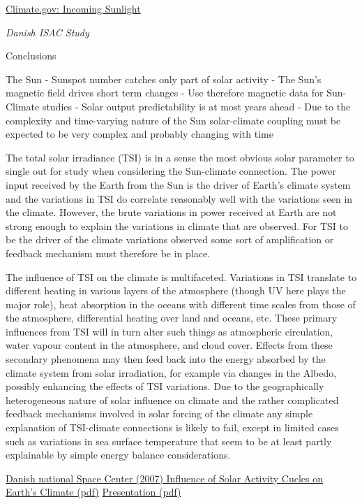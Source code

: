 \documentclass[
]{book}
\begin{document}
\href{https://www.climate.gov/news-features/understanding-climate/climate-change-incoming-sunlight}{Climate.gov: Incoming Sunlight}

\emph{Danish ISAC Study}

Conclusions

The Sun
- Sunspot number catches only part of solar activity
- The Sun's magnetic field drives short term changes
- Use therefore magnetic data for Sun-Climate studies
- Solar output predictability is at most years ahead
- Due to the complexity and time-varying nature of the Sun solar-climate coupling must be expected to be very complex and probably changing with time

The total solar irradiance (TSI) is in a sense the most obvious solar parameter to single
out for study when considering the Sun-climate connection. The power input received by
the Earth from the Sun is the driver of Earth's climate system and the variations in TSI do
correlate reasonably well with the variations seen in the climate. However, the brute
variations in power received at Earth are not strong enough to explain the variations in
climate that are observed.
For TSI to be the driver of the climate variations observed some
sort of amplification or feedback mechanism must therefore be in place.

The influence of TSI on the climate is multifaceted. Variations in TSI translate to
different heating in various layers of the atmosphere (though UV here plays the major
role), heat absorption in the oceans with different time scales from those of the
atmosphere, differential heating over land and oceans, etc. These primary influences from
TSI will in turn alter such things as atmospheric circulation, water vapour content in the
atmosphere, and cloud cover. Effects from these secondary phenomena may then feed
back into the energy absorbed by the climate system from solar irradiation, for example
via changes in the Albedo, possibly enhancing the effects of TSI variations.
Due to the geographically heterogeneous nature of solar influence on climate and the
rather complicated feedback mechanisms involved in solar forcing of the climate any
simple explanation of TSI-climate connections is likely to fail, except in limited cases
such as variations in sea surface temperature that seem to be at least partly explainable by
simple energy balance considerations.

\href{pdf/ISAC_2007_Solar.pdf}{Danish national Space Center (2007) Influence of Solar Activity Cucles on Earth's Climate (pdf)}
\href{pdf/ISAC_2007_Solar_Presentation.pdf}{Presentation (pdf)}
\end{document}
